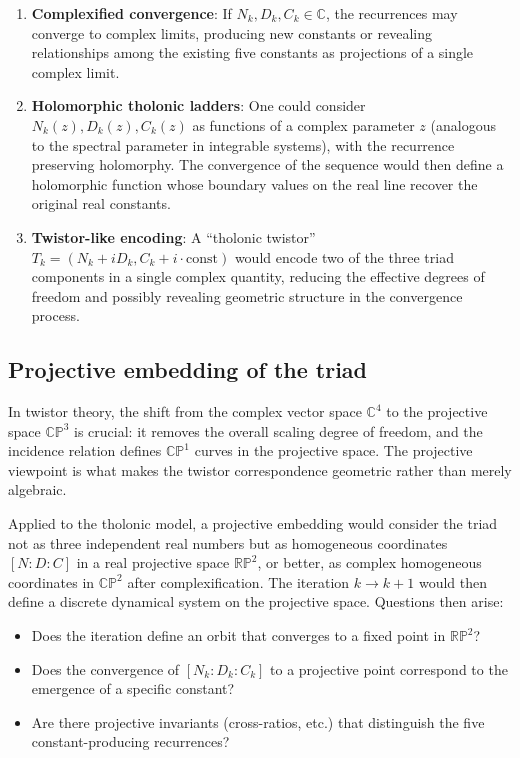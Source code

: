 \documentclass[12pt]{article}
\providecommand{\tightlist}{%
  \setlength{\itemsep}{0pt}\setlength{\parskip}{0pt}}
\begin{document}
\begin{enumerate}
\def\labelenumi{\arabic{enumi}.}
\item
  \textbf{Complexified convergence}: If
  \(N_k, D_k, C_k \in \mathbb{C}\), the recurrences may converge to
  complex limits, producing new constants or revealing relationships
  among the existing five constants as projections of a single complex
  limit.
\item
  \textbf{Holomorphic tholonic ladders}: One could consider
  \(N_k(z), D_k(z), C_k(z)\) as functions of a complex parameter \(z\)
  (analogous to the spectral parameter in integrable systems), with the
  recurrence preserving holomorphy. The convergence of the sequence
  would then define a holomorphic function whose boundary values on the
  real line recover the original real constants.
\item
  \textbf{Twistor-like encoding}: A ``tholonic twistor''
  \(T_k = (N_k + i D_k, C_k + i \cdot \text{const})\) would encode two
  of the three triad components in a single complex quantity, reducing
  the effective degrees of freedom and possibly revealing geometric
  structure in the convergence process.
\end{enumerate}

\subsection{Projective embedding of the triad}\label{projective-embedding-of-the-triad}

In twistor theory, the shift from the complex vector space
\(\mathbb{C}^4\) to the projective space \(\mathbb{CP}^3\) is crucial:
it removes the overall scaling degree of freedom, and the incidence
relation defines \(\mathbb{CP}^1\) curves in the projective space. The
projective viewpoint is what makes the twistor correspondence geometric
rather than merely algebraic.

Applied to the tholonic model, a projective embedding would consider the
triad not as three independent real numbers but as homogeneous
coordinates \([N : D : C]\) in a real projective space
\(\mathbb{RP}^2\), or better, as complex homogeneous coordinates in
\(\mathbb{CP}^2\) after complexification. The iteration \(k \to k+1\)
would then define a discrete dynamical system on the projective space.
Questions then arise:

\begin{itemize}
\tightlist
\item
  Does the iteration define an orbit that converges to a fixed point in
  \(\mathbb{RP}^2\)?
\item
  Does the convergence of \([N_k : D_k : C_k]\) to a projective point
  correspond to the emergence of a specific constant?
\item
  Are there projective invariants (cross-ratios, etc.) that distinguish
  the five constant-producing recurrences?
\end{itemize}
\end{document}
